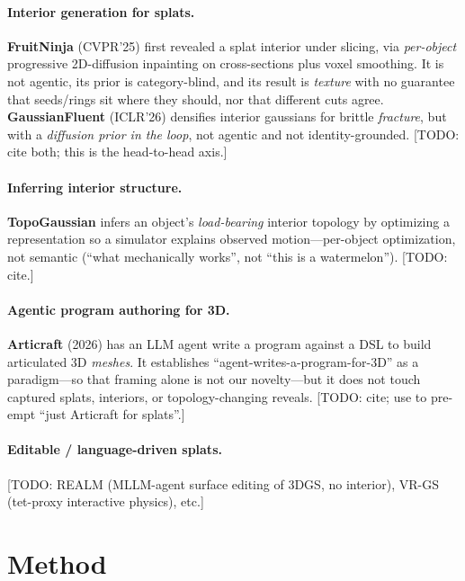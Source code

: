 \documentclass[10pt,twocolumn,letterpaper]{article}
\newcommand{\todo}[1]{{\color{red}\small[TODO: #1]}}
\begin{document}
\paragraph{Interior generation for splats.} \textbf{FruitNinja}
(CVPR'25) first revealed a splat interior under slicing, via
\emph{per-object} progressive 2D-diffusion inpainting on cross-sections
plus voxel smoothing. It is not agentic, its prior is category-blind,
and its result is \emph{texture} with no guarantee that seeds/rings sit
where they should, nor that different cuts agree. \textbf{GaussianFluent}
(ICLR'26) densifies interior gaussians for brittle \emph{fracture}, but
with a \emph{diffusion prior in the loop}, not agentic and not
identity-grounded. \todo{cite both; this is the head-to-head axis.}

\paragraph{Inferring interior structure.} \textbf{TopoGaussian} infers
an object's \emph{load-bearing} interior topology by optimizing a
representation so a simulator explains observed motion---per-object
optimization, not semantic (``what mechanically works'', not ``this is a
watermelon''). \todo{cite.}

\paragraph{Agentic program authoring for 3D.} \textbf{Articraft} (2026)
has an LLM agent write a program against a DSL to build articulated 3D
\emph{meshes}. It establishes ``agent-writes-a-program-for-3D'' as a
paradigm---so that framing alone is not our novelty---but it does not
touch captured splats, interiors, or topology-changing reveals.
\todo{cite; use to pre-empt ``just Articraft for splats''.}

\paragraph{Editable / language-driven splats.} \todo{REALM (MLLM-agent
surface editing of 3DGS, no interior), VR-GS (tet-proxy interactive
physics), etc.}

\section{Method}
\label{sec:method}
\end{document}
